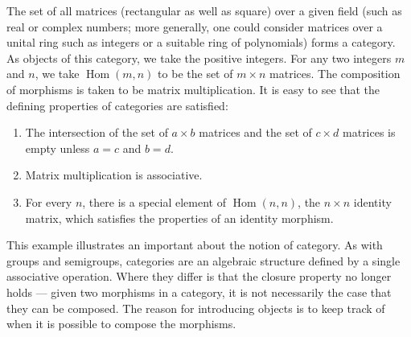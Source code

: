 \documentclass[12pt]{article}
\begin{document}
The set of all matrices (rectangular as well as square) 
over a given field (such as real or complex numbers; more
generally, one could consider matrices over a unital ring
such as integers or a suitable ring of polynomials) 
forms a category.  As objects of this category, we take the 
positive integers.  For any two integers $m$ and $n$, we 
take $\operatorname{Hom}(m,n)$ to be the set of $m \times n$
matrices.  The composition of morphisms is taken to be
matrix multiplication.  It is easy to see that the defining
properties of categories are satisfied:

\begin{enumerate}
\item The intersection of the set of $a \times b$ matrices and
the set of $c \times d$ matrices is empty unless $a = c$ and 
$b = d$.
\item Matrix multiplication is associative.
\item For every $n$, there is a special element of 
$\operatorname{Hom}(n,n)$, the $n \times n$ identity matrix,
which satisfies the properties of an identity morphism.
\end{enumerate}

This example illustrates an important  about 
the notion of category.  As with groups and semigroups, categories are
an algebraic structure defined by a single associative operation.
Where they differ is that the closure property no longer holds
--- given two morphisms in a category, it is not necessarily 
the case that they can be composed.  The reason for introducing
objects is to keep track of when it is possible to compose
the morphisms.
\end{document}
